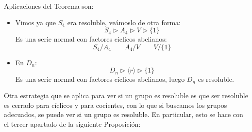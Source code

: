 \begin{ejemplo} %
    Aplicaciones del Teorema son:
    \begin{itemize}
        \item Vimos ya que $S_4$ era resoluble, veámoslo de otra forma:
            \begin{equation*}
                S_4 \rhd A_4 \rhd V \rhd \{1\}
            \end{equation*}
            Es una serie normal con factores cíclicos abelianos:
            \begin{equation*}
                S_4/A_4 \qquad A_4/V \qquad V/\{1\}
            \end{equation*}
        \item En $D_n$:
            \begin{equation*}
                D_n \rhd \langle r \rangle  \rhd \{1\}
            \end{equation*}
            Es una serie normal con factores cíclicos abelianos, luego $D_n$ es resoluble.
    \end{itemize}
\end{ejemplo}

\noindent
Otra estrategia que se aplica para ver si un grupo es resoluble es que ser resoluble es cerrado para cíclicos y para cocientes, con lo que si buscamos los grupos adecuados, se puede ver si un grupo es resoluble. En particular, esto se hace con el tercer apartado de la siguiente Proposición:

